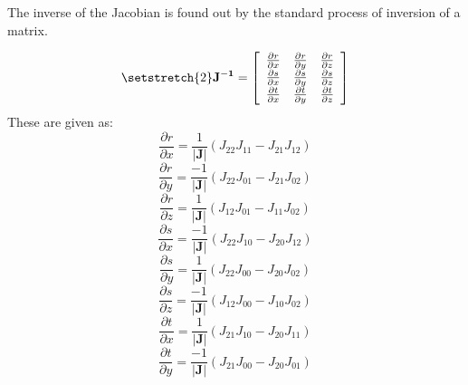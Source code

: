 The inverse of the Jacobian is found out by the standard process of inversion of a matrix.

\begin{equation}\label{JInv}
	{\setstretch{2}
	\mathbf{J^{-1}} = \left[\begin{array}{c c c}
		\frac{\partial r}{\partial x} & \frac{\partial r}{\partial y} &  \frac{\partial r}{\partial z} \\
		\frac{\partial s}{\partial x} & \frac{\partial s}{\partial y} &  \frac{\partial s}{\partial z} \\
		\frac{\partial t}{\partial x} & \frac{\partial t}{\partial y} &  \frac{\partial t}{\partial z} \\
											                   \end{array} \right]
        }
\end{equation}
These are given as:
\begin{equation}\label{metricTerms00}
	\frac{\partial r}{\partial x} = \frac{1}{|{\mathbf{J}}|} \left( J_{22}J_{11} - J_{21}J_{12}\right)
\end{equation}
\begin{equation}\label{metricTerms01}
	\frac{\partial r}{\partial y} = \frac{-1}{|{\mathbf{J}}|} \left( J_{22}J_{01} - J_{21}J_{02}\right)
\end{equation}
\begin{equation}\label{metricTerms02}
	\frac{\partial r}{\partial z} = \frac{1}{|{\mathbf{J}}|} \left( J_{12}J_{01} - J_{11}J_{02}\right)
\end{equation}
\begin{equation}\label{metricTerms10}
	\frac{\partial s}{\partial x} = \frac{-1}{|{\mathbf{J}}|} \left( J_{22}J_{10} - J_{20}J_{12}\right)
\end{equation}
\begin{equation}\label{metricTerms11}
	\frac{\partial s}{\partial y} = \frac{1}{|{\mathbf{J}}|} \left( J_{22}J_{00} - J_{20}J_{02}\right)
\end{equation}
\begin{equation}\label{metricTerms12}
	\frac{\partial s}{\partial z} = \frac{-1}{|{\mathbf{J}}|} \left( J_{12}J_{00} - J_{10}J_{02}\right)
\end{equation}
\begin{equation}\label{metricTerms20}
	\frac{\partial t}{\partial x} = \frac{1}{|{\mathbf{J}}|} \left( J_{21}J_{10} - J_{20}J_{11}\right)
\end{equation}
\begin{equation}\label{metricTerms21}
	\frac{\partial t}{\partial y} = \frac{-1}{|{\mathbf{J}}|} \left( J_{21}J_{00} - J_{20}J_{01}\right)
\end{equation}
